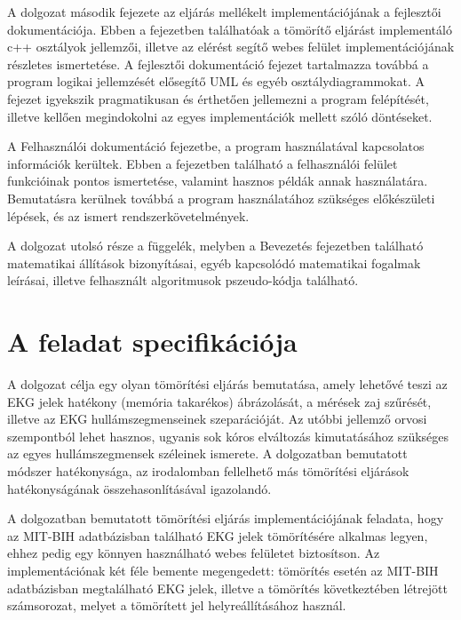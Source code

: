 \documentclass[oneside,titlepage,12pt,a4paper]{report}
\begin{document}
\par	A dolgozat második fejezete az eljárás mellékelt implementációjának a fejlesztői dokumentációja. Ebben a fejezetben találhatóak a tömörítő eljárást implementáló c++ osztályok jellemzői, illetve az elérést segítő webes felület implementációjának részletes ismertetése. A fejlesztői dokumentáció fejezet tartalmazza továbbá a program logikai jellemzését elősegítő UML és egyéb osztálydiagrammokat. A fejezet igyekszik pragmatikusan és érthetően jellemezni a program felépítését, illetve kellően megindokolni az egyes implementációk mellett szóló döntéseket. 
\par	A Felhasználói dokumentáció fejezetbe, a program használatával kapcsolatos információk kerültek. Ebben a fejezetben található a felhasználói felület funkcióinak pontos ismertetése, valamint hasznos példák annak használatára. Bemutatásra kerülnek továbbá a program használatához szükséges előkészületi lépések, és az ismert rendszerkövetelmények. 
\par	A dolgozat utolsó része a függelék, melyben a Bevezetés fejezetben található matematikai állítások bizonyításai, egyéb kapcsolódó matematikai fogalmak leírásai, illetve felhasznált algoritmusok pszeudo-kódja található. 
		
\section{A feladat specifikációja} \label{sec:specifik}

A dolgozat célja egy olyan tömörítési eljárás bemutatása, amely lehetővé teszi az EKG jelek hatékony (memória takarékos) ábrázolását, a mérések zaj szűrését, illetve az EKG hullámszegmenseinek szeparációját. Az utóbbi jellemző orvosi szempontból lehet hasznos, ugyanis sok kóros elváltozás kimutatásához szükséges az egyes hullámszegmensek széleinek ismerete. A dolgozatban bemutatott módszer hatékonysága, az irodalomban fellelhető más tömörítési eljárások \cite{neuralStuff, waveletOpt, ecgCompIrregular, kvadCikk, origCikk, ecgDataCompressionTech} hatékonyságának összehasonlításával igazolandó. \par A dolgozatban bemutatott tömörítési eljárás implementációjának feladata, hogy az MIT-BIH adatbázisban található EKG jelek tömörítésére alkalmas legyen, ehhez pedig egy könnyen használható webes felületet biztosítson. Az implementációnak két féle bemente megengedett: tömörítés esetén az MIT-BIH adatbázisban megtalálható EKG jelek, illetve a tömörítés következtében létrejött számsorozat, melyet a tömörített jel helyreállításához használ.  
\end{document}
